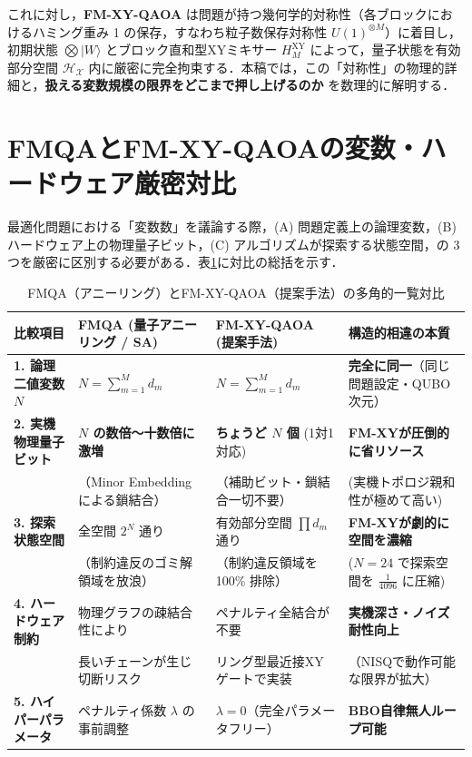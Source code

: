 \documentclass[11pt,a4paper]{ltjsarticle}
\newcommand{\ket}[1]{|#1\rangle}
\begin{document}
これに対し，\textbf{FM-XY-QAOA} は問題が持つ幾何学的対称性（各ブロックにおけるハミング重み 1 の保存，すなわち粒子数保存対称性 $U(1)^{\otimes M}$）に着目し，初期状態 $\bigotimes \ket{W}$ とブロック直和型XYミキサー $H_M^{\mathrm{XY}}$ によって，量子状態を有効部分空間 $\mathcal{H}_{\mathcal{X}}$ 内に厳密に完全拘束する．本稿では，この「対称性」の物理的詳細と，\textbf{扱える変数規模の限界をどこまで押し上げるのか} を数理的に解明する．

\section{FMQAとFM-XY-QAOAの変数・ハードウェア厳密対比}
\label{sec:variable_comparison}

最適化問題における「変数数」を議論する際，(A) 問題定義上の論理変数，(B) ハードウェア上の物理量子ビット，(C) アルゴリズムが探索する状態空間，の 3 つを厳密に区別する必要がある．表\ref{tab:variable_comparison}に対比の総括を示す．

\begin{table}[H]
\centering
\caption{FMQA（アニーリング）とFM-XY-QAOA（提案手法）の多角的一覧対比}\label{tab:variable_comparison}
\vspace{-1mm}
\scriptsize
\renewcommand{\arraystretch}{1.05}
\begin{tabularx}{\textwidth}{l p{4.8cm} p{5.0cm} X}
\toprule
\textbf{比較項目} & \textbf{FMQA (量子アニーリング / SA)} & \textbf{FM-XY-QAOA (提案手法)} & \textbf{構造的相違の本質} \\
\midrule
\textbf{1. 論理二値変数 $N$} & $N = \sum_{m=1}^M d_m$ & $N = \sum_{m=1}^M d_m$ & \textbf{完全に同一}（同じ問題設定・QUBO次元） \\
\midrule
\textbf{2. 実機物理量子ビット} & \textbf{$N$ の数倍〜十数倍に激増} & \textbf{ちょうど $N$ 個} (1対1対応) & \textbf{FM-XYが圧倒的に省リソース} \\
& （Minor Embedding による鎖結合） & （補助ビット・鎖結合一切不要） & (実機トポロジ親和性が極めて高い) \\
\midrule
\textbf{3. 探索状態空間} & 全空間 $2^N$ 通り & 有効部分空間 $\prod d_m$ 通り & \textbf{FM-XYが劇的に空間を濃縮} \\
& （制約違反のゴミ解領域を放浪） & （制約違反領域を 100\% 排除） & ($N=24$ で探索空間を $\frac{1}{4096}$ に圧縮) \\
\midrule
\textbf{4. ハードウェア制約} & 物理グラフの疎結合性により & ペナルティ全結合が不要 & \textbf{実機深さ・ノイズ耐性向上} \\
& 長いチェーンが生じ切断リスク & リング型最近接XYゲートで実装 & （NISQで動作可能な限界が拡大） \\
\midrule
\textbf{5. ハイパーパラメータ} & ペナルティ係数 $\lambda$ の事前調整 & $\lambda = 0$（完全パラメータフリー） & \textbf{BBO自律無人ループ可能} \\
\bottomrule
\end{tabularx}
\end{table}
\end{document}
